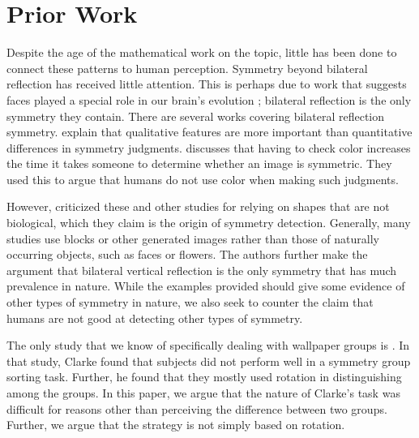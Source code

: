 \section{Prior Work}
Despite the age of the mathematical work on the topic, little has been done to connect these patterns to human perception. Symmetry beyond bilateral reflection has received little attention. This is perhaps due to work that suggests faces played a special role in our brain's evolution \citep{ffa}; bilateral reflection is the only symmetry they contain. There are several works covering bilateral reflection symmetry. \citet{bilateral-qual} explain that qualitative features are more important than quantitative differences in symmetry judgments. \citet{bilateral-color} discusses that having to check color increases the time it takes someone to determine whether an image is symmetric. They used this to argue that humans do not use color when making such judgments. 

However, \citet{bio} criticized these and other studies for relying on shapes that are not biological, which they claim is the origin of symmetry detection. Generally, many studies use blocks or other generated images rather than those of naturally occurring objects, such as faces or flowers. The authors further make the argument that bilateral vertical reflection is the only symmetry that has much prevalence in nature. While the examples provided should give some evidence of other types of symmetry in nature, we also seek to counter the claim that humans are not good at detecting other types of symmetry. 

The only study that we know of specifically dealing with wallpaper groups is \citet{clarke}. In that study, Clarke found that subjects did not perform well in a symmetry group sorting task. Further, he found that they mostly used rotation in distinguishing among the groups. In this paper, we argue that the nature of Clarke's task was difficult for reasons other than perceiving the difference between two groups. Further, we argue that the strategy is not simply based on rotation.
